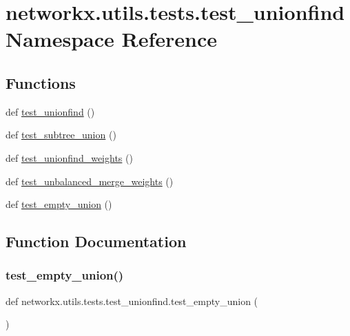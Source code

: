 \hypertarget{namespacenetworkx_1_1utils_1_1tests_1_1test__unionfind}{}\section{networkx.\+utils.\+tests.\+test\+\_\+unionfind Namespace Reference}
\label{namespacenetworkx_1_1utils_1_1tests_1_1test__unionfind}
\subsection*{Functions}
\begin{DoxyCompactItemize}
\item 
def \hyperlink{namespacenetworkx_1_1utils_1_1tests_1_1test__unionfind_ae2f9a4aea06979c8016c2828c86b6967}{test\+\_\+unionfind} ()
\item 
def \hyperlink{namespacenetworkx_1_1utils_1_1tests_1_1test__unionfind_a0d9a8a9cc797f3895b2e694e4936a36e}{test\+\_\+subtree\+\_\+union} ()
\item 
def \hyperlink{namespacenetworkx_1_1utils_1_1tests_1_1test__unionfind_ae350511bcb6dc83563bc6340acf13840}{test\+\_\+unionfind\+\_\+weights} ()
\item 
def \hyperlink{namespacenetworkx_1_1utils_1_1tests_1_1test__unionfind_a6fc2d7407db420c68466e27719c44abc}{test\+\_\+unbalanced\+\_\+merge\+\_\+weights} ()
\item 
def \hyperlink{namespacenetworkx_1_1utils_1_1tests_1_1test__unionfind_ac92e5e12460933c26211fbce9acd9815}{test\+\_\+empty\+\_\+union} ()
\end{DoxyCompactItemize}


\subsection{Function Documentation}
\mbox{\label{namespacenetworkx_1_1utils_1_1tests_1_1test__unionfind_ac92e5e12460933c26211fbce9acd9815}} 
\subsubsection{\texorpdfstring{test\+\_\+empty\+\_\+union()}{test\_empty\_union()}}
{\footnotesize\ttfamily def networkx.\+utils.\+tests.\+test\+\_\+unionfind.\+test\+\_\+empty\+\_\+union (\begin{DoxyParamCaption}{ }\end{DoxyParamCaption})}

